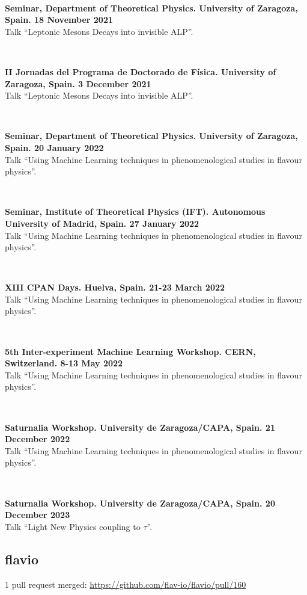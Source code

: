 \documentclass{cvf}
\begin{document}
~

\textbf{Seminar, Department of Theoretical Physics. University of Zaragoza, Spain. 18 November 2021}\\
Talk ``Leptonic Mesons Decays into invisible ALP''.

~

\textbf{II Jornadas del Programa de Doctorado de Física. University of Zaragoza, Spain. 3 December 2021}\\
Talk ``Leptonic Mesons Decays into invisible ALP''.

~

\textbf{Seminar, Department of Theoretical Physics. University of Zaragoza, Spain. 20 January 2022}\\
Talk ``Using Machine Learning techniques in phenomenological studies in flavour physics''.

~

\textbf{Seminar, Institute of Theoretical Physics (IFT). Autonomous University of Madrid, Spain. 27 January 2022}\\
Talk ``Using Machine Learning techniques in phenomenological studies in flavour physics''.

~

\textbf{XIII CPAN Days. Huelva, Spain. 21-23 March 2022}\\
Talk ``Using Machine Learning techniques in phenomenological studies in flavour physics''.

~

\textbf{5th Inter-experiment Machine Learning Workshop. CERN, Switzerland. 8-13 May 2022}\\
Talk ``Using Machine Learning techniques in phenomenological studies in flavour physics''.

~

\textbf{Saturnalia Workshop. University de Zaragoza/CAPA, Spain. 21 December 2022}\\
Talk ``Using Machine Learning techniques in phenomenological studies in flavour physics''.

~

\textbf{Saturnalia Workshop. University de Zaragoza/CAPA, Spain. 20 December 2023}\\
Talk ``Light New Physics coupling to $\tau$''.



\subsection{flavio}
1 pull request merged: \url{https://github.com/flav-io/flavio/pull/160}
\end{document}
